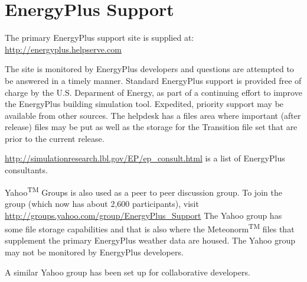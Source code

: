 \section{EnergyPlus Support}\label{energyplus-support}

The primary EnergyPlus support site is supplied at: \url{http://energyplus.helpserve.com}

The site is monitored by EnergyPlus developers and questions are attempted to be answered in a timely manner. Standard EnergyPlus support is provided free of charge by the U.S. Deparment of Energy, as part of a continuing effort to improve the EnergyPlus building simulation tool. Expedited, priority support may be available from other sources. The helpdesk has a files area where important (after release) files may be put as well as the storage for the Transition file set that are prior to the current release.

\url{http://simulationresearch.lbl.gov/EP/ep_consult.html} is a list of EnergyPlus consultants.

Yahoo\textsuperscript{TM} Groups is also used as a peer to peer discussion group. To join the group (which now has about 2,600 participants), visit \href{http://groups.yahoo.com/EnergyPlus_Support}{http://groups.yahoo.com/group/EnergyPlus\_Support} The Yahoo group has some file storage capabilities and that is also where the Meteonorm\textsuperscript{TM} files that supplement the primary EnergyPlus weather data are housed. The Yahoo group may not be monitored by EnergyPlus developers.

A similar Yahoo group has been set up for collaborative developers.
